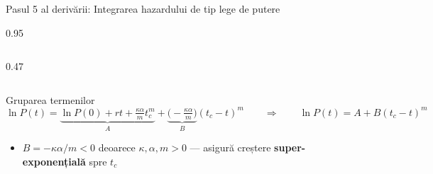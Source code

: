 \documentclass[9pt, aspectratio=169, t]{beamer}
\begin{document}
\begin{frame}{Pasul 5 al derivării: Integrarea hazardului de tip lege de putere}
\begin{cminipage}{0.95\textwidth}
{\begin{columns}[T]
\begin{column}{0.47\textwidth}
        \end{column}
    \end{columns}
    \vspace{-2mm}
    \begin{exampleblock}{Gruparea termenilor}
        \vspace{-2mm}
        $$\ln P(t) = \underbrace{\ln P(0) + rt + \tfrac{\kappa\alpha}{m}t_c^m}_{\displaystyle A} + \underbrace{\bigl(-\tfrac{\kappa\alpha}{m}\bigr)}_{\displaystyle B}(t_c - t)^m \qquad\Longrightarrow\qquad \boxed{\ln P(t) = A + B(t_c - t)^m}$$
        \vspace{-3mm}
        \begin{itemize}\setlength{\itemsep}{0pt}
            \item $B = -\kappa\alpha/m < 0$ deoarece $\kappa, \alpha, m > 0$ --- asigură creștere \textbf{super-exponențială} spre $t_c$
        \end{itemize}
    \end{exampleblock}
    }
    \end{cminipage}
\end{frame}
\end{document}
